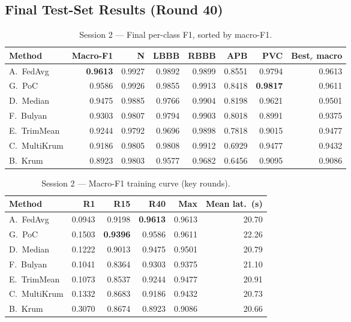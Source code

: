 \documentclass[11pt,a4paper]{article}
\begin{document}
\subsection{Final Test-Set Results (Round 40)}

\begin{table}[H]
\centering
\caption{Session 2 --- Final per-class F1, sorted by macro-F1.}
\label{tab:s2_final}
\begin{tabular}{@{}l r rrrrr r@{}}
\toprule
\textbf{Method} & \textbf{Macro-F1} & \textbf{N} & \textbf{LBBB} & \textbf{RBBB} & \textbf{APB} & \textbf{PVC} & \textbf{Best$_{r}$ macro} \\
\midrule
A.\ FedAvg    & \textbf{0.9613} & 0.9927 & 0.9892 & 0.9899 & 0.8551 & 0.9794 & 0.9613 \\
G.\ PoC       & 0.9586 & 0.9926 & 0.9855 & 0.9913 & 0.8418 & \textbf{0.9817} & 0.9611 \\
D.\ Median    & 0.9475 & 0.9885 & 0.9766 & 0.9904 & 0.8198 & 0.9621 & 0.9501 \\
F.\ Bulyan    & 0.9303 & 0.9807 & 0.9794 & 0.9903 & 0.8018 & 0.8991 & 0.9375 \\
E.\ TrimMean  & 0.9244 & 0.9792 & 0.9696 & 0.9898 & 0.7818 & 0.9015 & 0.9477 \\
C.\ MultiKrum & 0.9186 & 0.9805 & 0.9808 & 0.9912 & 0.6929 & 0.9477 & 0.9432 \\
\rowcolor{softred}
B.\ Krum      & 0.8923 & 0.9803 & 0.9577 & 0.9682 & 0.6456 & 0.9095 & 0.9086 \\
\bottomrule
\end{tabular}
\end{table}

\begin{table}[H]
\centering
\caption{Session 2 --- Macro-F1 training curve (key rounds).}
\label{tab:s2_curve}
\begin{tabular}{@{}l rrrr r@{}}
\toprule
\textbf{Method} & \textbf{R1} & \textbf{R15} & \textbf{R40} & \textbf{Max} & \textbf{Mean lat.\ (s)} \\
\midrule
A.\ FedAvg    & 0.0943 & 0.9198 & \textbf{0.9613} & 0.9613 & 20.70 \\
G.\ PoC       & 0.1503 & \textbf{0.9396} & 0.9586 & 0.9611 & 22.26 \\
D.\ Median    & 0.1222 & 0.9013 & 0.9475 & 0.9501 & 20.79 \\
F.\ Bulyan    & 0.1041 & 0.8364 & 0.9303 & 0.9375 & 21.10 \\
E.\ TrimMean  & 0.1073 & 0.8537 & 0.9244 & 0.9477 & 20.91 \\
C.\ MultiKrum & 0.1332 & 0.8683 & 0.9186 & 0.9432 & 20.73 \\
\rowcolor{softred}
B.\ Krum      & 0.3070 & 0.8674 & 0.8923 & 0.9086 & 20.66 \\
\bottomrule
\end{tabular}
\end{table}
\end{document}

